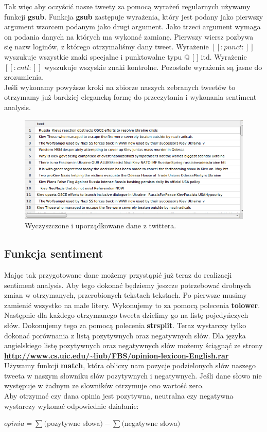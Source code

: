 \documentclass[12pt,a4paper]{article}
\begin{document}
Tak więc aby oczyścić nasze tweety za pomocą wyrażeń regularnych używamy funkcji \textbf{gsub}. Funkcja \textbf{gsub} zastępuje wyrażenia, który jest podany jako pierwszy argument wzorcem podanym jako drugi argument. Jako trzeci argument wymaga on podania danych na których ma wykonać zamianę. Pierwszy wiersz pozbywa się nazw loginów, z którego otrzymaliśmy dany tweet. 
Wyrażenie \textbf{$[[:punct:]]$} wyszukuje wszystkie znaki specjalne i punktowalne typu @ [ ] itd. Wyrażenie \textbf{$[[:cntl:]]$} wyszukuje wszyskie znaki kontrolne. Pozostałe wyrażenia są jasne do zrozumienia. \\
Jeśli wykonamy powyższe kroki na zbiorze naszych zebranych tweetów to otrzymamy już bardziej elegancką formę do przeczytania i wykonania sentiment analysis.

\begin{figure}[H]
\begin{center}
\includegraphics[scale=0.5]{pictures/Data2.png}
\caption{Wyczyszczone i uporządkowane dane z twittera.}
\end{center}
\end{figure}


\subsection[Funkcja sentiment]{Funkcja sentiment}
Mając tak przygotowane dane możemy przystąpić już teraz do realizacji sentiment analysis. Aby tego dokonać będziemy jeszcze potrzebować drobnych zmian w otrzymanych, przerobionych tekstach tekstach. Po pierwsze musimy zamienić wszystko na małe litery. Wykonujemy to za pomocą polecenia \textbf{tolower}. 
Następnie dla każdego otrzymanego tweeta dzielimy go na listę pojedyńczych słów. Dokonujemy tego za pomocą polecenia \textbf{strsplit}. 
Teraz wystarczy tylko dokonać porównania z listą pozytywnych oraz negatywnych słów. Dla języka angielskiego listę pozytywnych oraz negatywnych słów możemy ściągnąć ze strony \textbf{\url{http://www.cs.uic.edu/~liub/FBS/opinion-lexicon-English.rar}} \\
Używamy funkcji \textbf{match}, która obliczy nam pozycje podzielonych słów naszego tweeta w naszym słowniku słów pozytywnych i negatywnych. Jeśli dane słowo nie występuje w żadnym ze słowników otrzymuje ono wartość zero. \\
Aby otrzymać czy dana opinia jest pozytywna, neutralna czy negatywna wystarczy  wykonać odpowiednie działanie: 
\begin{center}
$ opinia = \sum ($pozytywne słowa$) - \sum ($negatywne słowa$) $ \\
\end{center}
\end{document}
